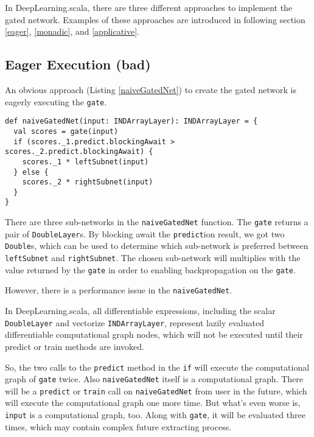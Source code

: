 In DeepLearning.scala, there are three different approaches to implement the gated network. Examples of these approaches are introduced in following section \ref{eager}, \ref{monadic}, and \ref{applicative}.

\subsection{Eager Execution (bad)\label{eager}}

An obvious approach (Listing \ref{naiveGatedNet}) to create the gated network is eagerly executing the \lstinline{gate}.

\begin{lstlisting}[float={htbp},caption={The eager execution implementation of gated network}, label={naiveGatedNet}]
def naiveGatedNet(input: INDArrayLayer): INDArrayLayer = {
  val scores = gate(input)
  if (scores._1.predict.blockingAwait > scores._2.predict.blockingAwait) {
    scores._1 * leftSubnet(input)
  } else {
    scores._2 * rightSubnet(input)
  }
}
\end{lstlisting}

There are three sub-networks in the \lstinline{naiveGatedNet} function. The \lstinline{gate} returns a pair of \lstinline{DoubleLayer}s. By blocking await the \lstinline{predict}ion result, we got two \lstinline{Double}s, which can be used to determine which sub-network is preferred between \lstinline{leftSubnet} and \lstinline{rightSubnet}. The chosen sub-network will multiplies with the value returned by the \lstinline{gate} in order to enabling backpropagation on the \lstinline{gate}.

However, there is a performance issue in the \lstinline{naiveGatedNet}.

In DeepLearning.scala, all differentiable expressions, including the scalar \lstinline{DoubleLayer} and vectorize \lstinline{INDArrayLayer}, represent lazily evaluated differentiable computational graph nodes, which will not be executed until their predict or train methods are invoked.

So, the two calls to the \lstinline{predict} method in the \lstinline{if} will execute the computational graph of \lstinline{gate} twice. Also \lstinline{naiveGatedNet} itself is a computational graph. There will be a \lstinline{predict} or \lstinline{train} call on \lstinline{naiveGatedNet} from user in the future, which will execute the computational graph one more time. But what's even worse is, \lstinline{input} is a computational graph, too. Along with \lstinline{gate}, it will be evaluated three times, which may contain complex future extracting process.

